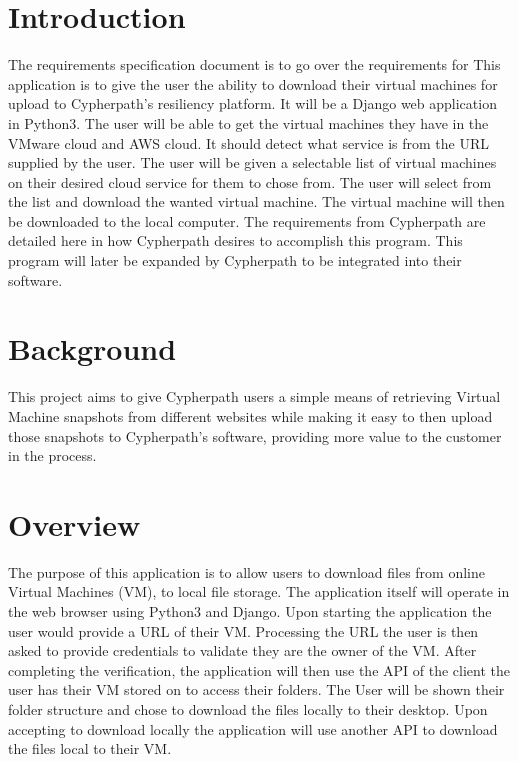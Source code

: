 \documentclass{article}
\title{}
\author{}
\date{}
\begin{document}
    

    \tableofcontents
    \listoffigures

    \newpage
    \begin{versionhistory}
    \end{versionhistory}
    \newpage

    \section{Introduction}
    The requirements specification document is to go over the requirements for %
    This application is to give the user the ability to download their virtual machines for upload to Cypherpath’s resiliency platform.
    It will be a Django web application in Python3. The user will be able to get the virtual machines they have in the VMware cloud and AWS cloud.
    It should detect what service is from the URL supplied by the user. The user will be given a selectable list of virtual machines on
    their desired cloud service for them to chose from. The user will select from the list and download the wanted virtual machine.
    The virtual machine will then be downloaded to the local computer. The requirements from Cypherpath are detailed here in how Cypherpath desires to
    accomplish this program. This program will later be expanded by Cypherpath to be integrated into their software.     
    

    \section{Background}
	This project aims to give Cypherpath users a simple means of retrieving Virtual Machine snapshots from different websites while making it easy to 
	then upload those snapshots to Cypherpath's software, providing more value to the customer in the process.


    \section{Overview}
    The purpose of this application is to allow users to download files from online Virtual Machines (VM), to local file storage.
    The application itself will operate in the web browser using Python3 and Django. Upon starting the application the user would
    provide a URL of their VM. Processing the URL the user is then asked to provide credentials to validate they are the owner of
    the VM. After completing the verification, the application will then use the API of the client the user has their VM stored on
    to access their folders. The User will be shown their folder structure and chose to download the files locally to their desktop.
    Upon accepting to download locally the application will use another API to download the files local to their VM.
\end{document}
